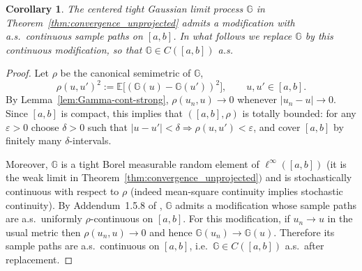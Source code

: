 \documentclass[12pt]{article}
\newcommand{\E}{\mathbb{E}}
\newtheorem{corollary}{Corollary}
\begin{document}
\begin{corollary}\label{cor:cont-version}
The centered tight Gaussian limit process $\mathbb G$ in Theorem~\ref{thm:convergence_unprojected}
admits a modification with a.s.\ continuous sample paths on $[a,b]$.
In what follows we replace $\mathbb G$ by this continuous modification, so that $\mathbb G\in C([a,b])$ a.s.
\end{corollary}

\begin{proof}
Let $\rho$ be the canonical semimetric of $\mathbb G$,
\[
\rho(u,u')^2 := \E\!\big[(\mathbb G(u)-\mathbb G(u'))^2\big],\qquad u,u'\in[a,b].
\]
By Lemma~\ref{lem:Gamma-cont-strong}, $\rho(u_n,u)\to0$ whenever $|u_n-u|\to0$.
Since $[a,b]$ is compact, this implies that $([a,b],\rho)$ is totally bounded: for any $\varepsilon>0$
choose $\delta>0$ such that $|u-u'|<\delta\Rightarrow \rho(u,u')<\varepsilon$, and cover $[a,b]$ by finitely many
$\delta$-intervals.

Moreover, $\mathbb G$ is a tight Borel measurable random element of $\ell^\infty([a,b])$
(it is the weak limit in Theorem~\ref{thm:convergence_unprojected}$)$ and is stochastically continuous with
respect to $\rho$ (indeed mean-square continuity implies stochastic continuity).
By Addendum~1.5.8 of \citet{vaart1996weak}, $\mathbb G$ admits a modification whose sample paths are a.s.\ uniformly
$\rho$-continuous on $[a,b]$.
For this modification, if $u_n\to u$ in the usual metric then $\rho(u_n,u)\to0$ and hence $\mathbb G(u_n)\to \mathbb G(u)$.
Therefore its sample paths are a.s.\ continuous on $[a,b]$, i.e.\ $\mathbb G\in C([a,b])$ a.s.\ after replacement.
\end{proof}
\end{document}
